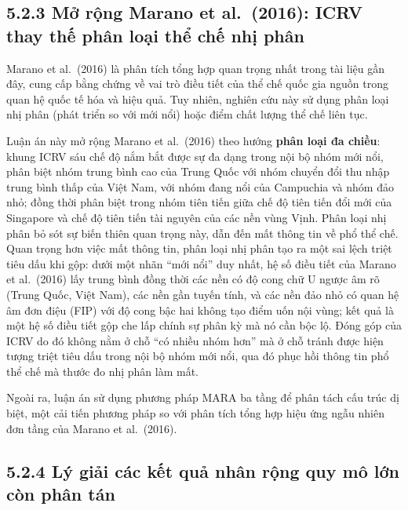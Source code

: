 \documentclass[
  a4paper,
  13pt]{extreport}
\begin{document}
\hypertarget{mux1edf-rux1ed9ng-marano-et-al.-2016-icrv-thay-thux1ebf-phuxe2n-loux1ea1i-thux1ec3-chux1ebf-nhux1ecb-phuxe2n}{%
\subsection{5.2.3 Mở rộng Marano et al.~(2016): ICRV thay thế phân loại
thể chế nhị
phân}\label{mux1edf-rux1ed9ng-marano-et-al.-2016-icrv-thay-thux1ebf-phuxe2n-loux1ea1i-thux1ec3-chux1ebf-nhux1ecb-phuxe2n}}

Marano et al.~(2016) là phân tích tổng hợp quan trọng nhất trong tài
liệu gần đây, cung cấp bằng chứng về vai trò điều tiết của thể chế quốc
gia nguồn trong quan hệ quốc tế hóa và hiệu quả. Tuy nhiên, nghiên cứu
này sử dụng phân loại nhị phân (phát triển so với mới nổi) hoặc điểm
chất lượng thể chế liên tục.

Luận án này mở rộng Marano et al.~(2016) theo hướng \textbf{phân loại đa
chiều}: khung ICRV sáu chế độ nắm bắt được sự đa dạng trong nội bộ nhóm
mới nổi, phân biệt nhóm trung bình cao của Trung Quốc với nhóm chuyển
đổi thu nhập trung bình thấp của Việt Nam, với nhóm đang nổi của
Campuchia và nhóm đảo nhỏ; đồng thời phân biệt trong nhóm tiên tiến giữa
chế độ tiên tiến đổi mới của Singapore và chế độ tiên tiến tài nguyên
của các nền vùng Vịnh. Phân loại nhị phân bỏ sót sự biến thiên quan
trọng này, dẫn đến mất thông tin về phổ thể chế. Quan trọng hơn việc mất
thông tin, phân loại nhị phân tạo ra một sai lệch triệt tiêu dấu khi
gộp: dưới một nhãn ``mới nổi'' duy nhất, hệ số điều tiết của Marano et
al.~(2016) lấy trung bình đồng thời các nền có độ cong chữ U ngược âm rõ
(Trung Quốc, Việt Nam), các nền gần tuyến tính, và các nền đảo nhỏ có
quan hệ âm đơn điệu (FIP) với độ cong bậc hai không tạo điểm uốn nội
vùng; kết quả là một hệ số điều tiết gộp che lấp chính sự phân kỳ mà nó
cần bộc lộ. Đóng góp của ICRV do đó không nằm ở chỗ ``có nhiều nhóm
hơn'' mà ở chỗ tránh được hiện tượng triệt tiêu dấu trong nội bộ nhóm
mới nổi, qua đó phục hồi thông tin phổ thể chế mà thước đo nhị phân làm
mất.

Ngoài ra, luận án sử dụng phương pháp MARA ba tầng để phân tách cấu trúc
dị biệt, một cải tiến phương pháp so với phân tích tổng hợp hiệu ứng
ngẫu nhiên đơn tầng của Marano et al.~(2016).

\hypertarget{luxfd-giux1ea3i-cuxe1c-kux1ebft-quux1ea3-nhuxe2n-rux1ed9ng-quy-muxf4-lux1edbn-cuxf2n-phuxe2n-tuxe1n}{%
\subsection{5.2.4 Lý giải các kết quả nhân rộng quy mô lớn còn phân
tán}\label{luxfd-giux1ea3i-cuxe1c-kux1ebft-quux1ea3-nhuxe2n-rux1ed9ng-quy-muxf4-lux1edbn-cuxf2n-phuxe2n-tuxe1n}}
\end{document}
